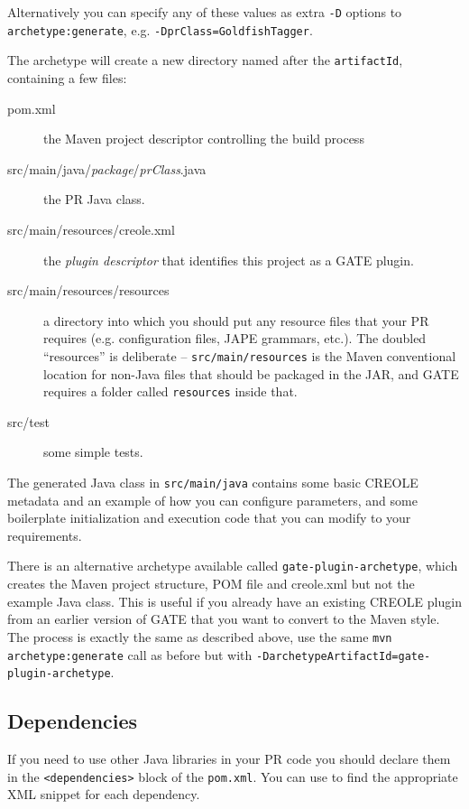 Alternatively you can specify any of these values as extra \verb!-D! options to
\verb!archetype:generate!, e.g. \verb!-DprClass=GoldfishTagger!.

The archetype will create a new directory named after the \texttt{artifactId},
containing a few files:
\begin{description}
\item[pom.xml] the Maven project descriptor controlling the build process
\item[src/main/java/\emph{package}/\emph{prClass}.java] the PR Java class.
\item[src/main/resources/creole.xml] the \emph{plugin descriptor} that
  identifies this project as a GATE plugin.
\item[src/main/resources/resources] a directory into which you should put any
  resource files that your PR requires (e.g. configuration files, JAPE
  grammars, etc.).  The doubled ``resources'' is deliberate --
  \verb!src/main/resources! is the Maven conventional location for non-Java
  files that should be packaged in the JAR, and GATE requires a folder called
  \verb!resources! inside that.
\item[src/test] some simple tests.
\end{description}

The generated Java class in \texttt{src/main/java} contains some basic CREOLE
metadata and an example of how you can configure parameters, and some
boilerplate initialization and execution code that you can modify to your
requirements.

There is an alternative archetype available called
\texttt{gate-plugin-archetype}, which creates the Maven project structure, POM
file and creole.xml but not the example Java class.  This is useful if you
already have an existing CREOLE plugin from an earlier version of GATE that you
want to convert to the Maven style.  The process is exactly the same as
described above, use the same \texttt{mvn archetype:generate} call as before
but with \verb!-DarchetypeArtifactId=gate-plugin-archetype!.

\subsection*{Dependencies}

If you need to use other Java libraries in your PR code you should declare them
in the \verb!<dependencies>! block of the \texttt{pom.xml}.  You can use
 to find the appropriate XML snippet for
each dependency.

